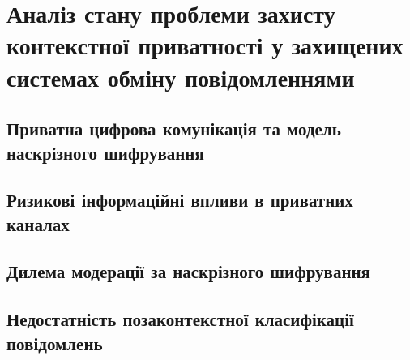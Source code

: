 \chapter{Аналіз стану проблеми захисту контекстної приватності у захищених системах обміну повідомленнями}
\label{ch:analysis}


\section{Приватна цифрова комунікація та модель наскрізного шифрування}
\label{sec:e2ee-model}

\section{Ризикові інформаційні впливи в приватних каналах}
\label{sec:harms}

\section{Дилема модерації за наскрізного шифрування}
\label{sec:moderation-dilemma}

\section{Недостатність позаконтекстної класифікації повідомлень}
\label{sec:context-gap}

